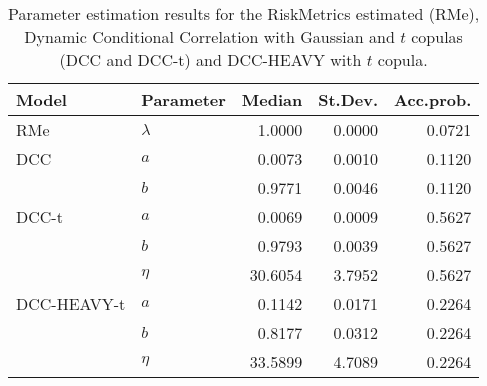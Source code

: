 \begin{table}[ht]
\centering
\caption{Parameter estimation results for the 
             RiskMetrics estimated (RMe), Dynamic Conditional Correlation
             with Gaussian and $t$ copulas (DCC and DCC-t) and DCC-HEAVY with $t$ copula. } 
\label{table:all_pars_lf}
\begingroup\footnotesize
\begin{tabular}{llrrr}
  \hline
Model & Parameter & Median & St.Dev. & Acc.prob. \\ 
  \hline
RMe & $\lambda$ & 1.0000 & 0.0000 & 0.0721 \\ 
  DCC & $a$ & 0.0073 & 0.0010 & 0.1120 \\ 
   & $b$ & 0.9771 & 0.0046 & 0.1120 \\ 
  DCC-t & $a$ & 0.0069 & 0.0009 & 0.5627 \\ 
   & $b$ & 0.9793 & 0.0039 & 0.5627 \\ 
   & $\eta$ & 30.6054 & 3.7952 & 0.5627 \\ 
  DCC-HEAVY-t & $a$ & 0.1142 & 0.0171 & 0.2264 \\ 
   & $b$ & 0.8177 & 0.0312 & 0.2264 \\ 
   & $\eta$ & 33.5899 & 4.7089 & 0.2264 \\ 
   \hline
\end{tabular}
\endgroup
\end{table}
